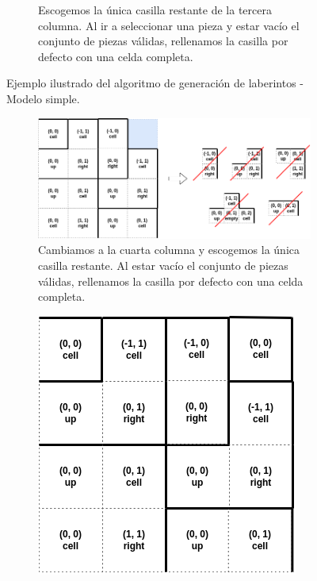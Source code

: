 \begin{figure}[H]
\begin{subfigure}[b]{0.95\textwidth}
            \caption{Escogemos la única casilla restante de la tercera columna. Al ir a seleccionar una pieza y estar vacío el conjunto de piezas válidas, rellenamos la casilla por defecto con una celda completa.}
        \end{subfigure}
        \caption{Ejemplo ilustrado del algoritmo de generación de laberintos - Modelo simple.}
        \label{fig:simple2}
    \end{figure}
    
    \begin{figure}[H]
    \ContinuedFloat 
    \centering
        \begin{subfigure}[b]{0.95\textwidth}
            \centering
            \includegraphics[scale=0.45]{img/paso7.png}
            \caption{Cambiamos a la cuarta columna y escogemos la única casilla restante. Al estar vacío el conjunto de piezas válidas, rellenamos la casilla por defecto con una celda completa.}
        \end{subfigure}
        \par\bigskip
        \begin{subfigure}[b]{0.95\textwidth}
            \centering
            \includegraphics[scale=0.45]{img/paso8.png}

\end{subfigure}
\end{figure}
